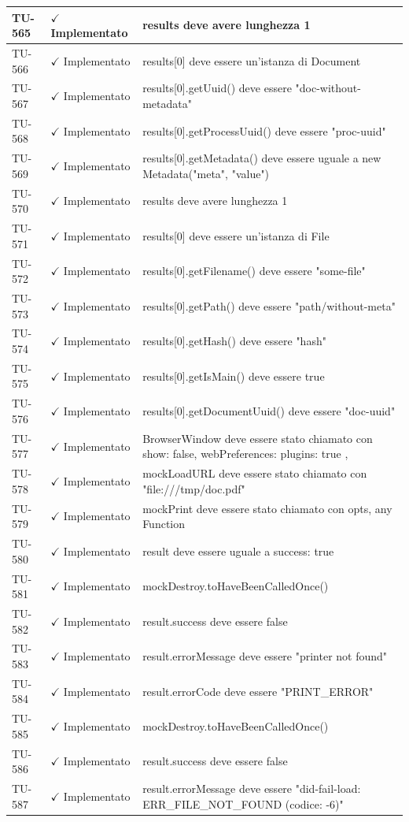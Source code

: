 ﻿\documentclass[a4paper,12pt]{article}
\newcommand{\ok}{\textcolor{green!60!black}{$\checkmark$ Implementato}}
\begin{document}
\begin{longtable}{|p{2cm}|p{3.5cm}|p{9.5cm}|}
\hline
TU-565 & \ok & results deve avere lunghezza 1 \\
\hline
TU-566 & \ok & results[0] deve essere un'istanza di Document \\
\hline
TU-567 & \ok & results[0].getUuid() deve essere "doc-without-metadata" \\
\hline
TU-568 & \ok & results[0].getProcessUuid() deve essere "proc-uuid" \\
\hline
TU-569 & \ok & results[0].getMetadata() deve essere uguale a new Metadata("meta", "value") \\
\hline
TU-570 & \ok & results deve avere lunghezza 1 \\
\hline
TU-571 & \ok & results[0] deve essere un'istanza di File \\
\hline
TU-572 & \ok & results[0].getFilename() deve essere "some-file" \\
\hline
TU-573 & \ok & results[0].getPath() deve essere "path/without-meta" \\
\hline
TU-574 & \ok & results[0].getHash() deve essere "hash" \\
\hline
TU-575 & \ok & results[0].getIsMain() deve essere true \\
\hline
TU-576 & \ok & results[0].getDocumentUuid() deve essere "doc-uuid" \\
\hline
TU-577 & \ok & BrowserWindow deve essere stato chiamato con { show: false, webPreferences: { plugins: true }, } \\
\hline
TU-578 & \ok & mockLoadURL deve essere stato chiamato con "file:///tmp/doc.pdf" \\
\hline
TU-579 & \ok & mockPrint deve essere stato chiamato con opts, any Function \\
\hline
TU-580 & \ok & result deve essere uguale a { success: true } \\
\hline
TU-581 & \ok & mockDestroy.toHaveBeenCalledOnce() \\
\hline
TU-582 & \ok & result.success deve essere false \\
\hline
TU-583 & \ok & result.errorMessage deve essere "printer not found" \\
\hline
TU-584 & \ok & result.errorCode deve essere "PRINT\_ERROR" \\
\hline
TU-585 & \ok & mockDestroy.toHaveBeenCalledOnce() \\
\hline
TU-586 & \ok & result.success deve essere false \\
\hline
TU-587 & \ok & result.errorMessage deve essere "did-fail-load: ERR\_FILE\_NOT\_FOUND (codice: -6)" \\

\end{longtable}
\end{document}
